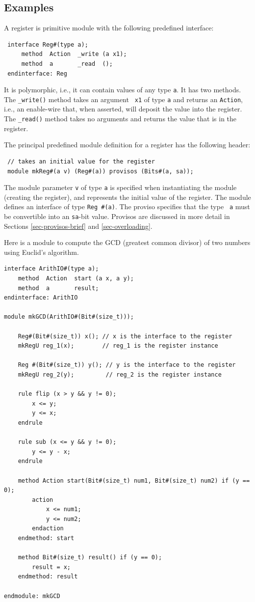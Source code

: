 \documentclass[twoside,letterpaper]{article}
\begin{document}

\subsection{Examples}

\label{sec-module-examples}

A register is primitive module with the following predefined
interface:
\begin{verbatim}
 interface Reg#(type a);
     method  Action  _write (a x1);
     method  a       _read  ();
 endinterface: Reg
\end{verbatim}
It is polymorphic, i.e., it can contain values of any type \texttt{a}.
It has two methods.  The \texttt{\_write()} method takes an argument {\tt
x1} of type \texttt{a} and returns an \texttt{Action}, i.e., an enable-wire
that, when asserted, will deposit the value into the register.  The
\texttt{\_read()} method takes no arguments and returns the value that is
in the register.

The principal predefined module definition for a register has the
following header:
\begin{verbatim}
 // takes an initial value for the register
 module mkReg#(a v) (Reg#(a)) provisos (Bits#(a, sa));
\end{verbatim}
The module parameter \texttt{v} of type \texttt{a} is specified when
instantiating the module (creating the register), and represents the
initial value of the register.  The module defines an interface of
type \mbox{\texttt{Reg \#(a)}}.  The proviso specifies that the type {\tt
a} must be convertible into an \texttt{sa}-bit value.  Provisos are
discussed in more detail in Sections \ref{sec-provisos-brief} and
\ref{sec-overloading}.

Here is a module to compute the GCD (greatest common divisor) of two
numbers using Euclid's algorithm.
\begin{verbatim}
interface ArithIO#(type a);
    method  Action  start (a x, a y);
    method  a       result;
endinterface: ArithIO

module mkGCD(ArithIO#(Bit#(size_t))); 
   
    Reg#(Bit#(size_t)) x(); // x is the interface to the register
    mkRegU reg_1(x);        // reg_1 is the register instance

    Reg #(Bit#(size_t)) y(); // y is the interface to the register
    mkRegU reg_2(y);         // reg_2 is the register instance

    rule flip (x > y && y != 0);
        x <= y;
        y <= x;
    endrule

    rule sub (x <= y && y != 0);
        y <= y - x;
    endrule

    method Action start(Bit#(size_t) num1, Bit#(size_t) num2) if (y == 0);
        action
            x <= num1;
            y <= num2;
        endaction
    endmethod: start

    method Bit#(size_t) result() if (y == 0);
        result = x;
    endmethod: result

endmodule: mkGCD
\end{verbatim}
\end{document}
